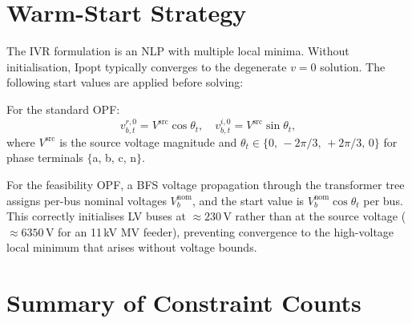 \documentclass[11pt,a4paper]{article}
\begin{document}
\section{Warm-Start Strategy}

The IVR formulation is an NLP with multiple local minima.  Without
initialisation, Ipopt typically converges to the degenerate $v = 0$ solution.
The following start values are applied before solving:

For the standard OPF:
\begin{equation}
  v^{r,0}_{b,t} = V^\text{src} \cos\theta_t,\quad
  v^{i,0}_{b,t} = V^\text{src} \sin\theta_t,
\end{equation}
where $V^\text{src}$ is the source voltage magnitude and
$\theta_t \in \{0,\,-2\pi/3,\,+2\pi/3,\,0\}$ for phase terminals
$\{$a, b, c, n$\}$.

For the feasibility OPF, a BFS voltage propagation through the transformer
tree assigns per-bus nominal voltages $V^\text{nom}_b$, and the start value
is $V^\text{nom}_b\cos\theta_t$ per bus.  This correctly initialises LV buses
at $\approx 230$\,V rather than at the source voltage ($\approx 6350$\,V for
an 11\,kV MV feeder), preventing convergence to the high-voltage local minimum
that arises without voltage bounds.

\section{Summary of Constraint Counts}
\end{document}
